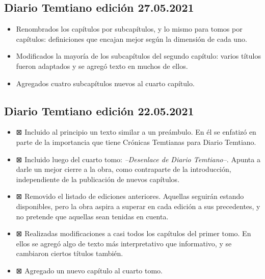 \documentclass[
]{book}
\begin{document}
\hypertarget{diario-temtiano-ediciuxf3n-27.05.2021}{%
\subsection*{Diario Temtiano edición 27.05.2021}\label{diario-temtiano-ediciuxf3n-27.05.2021}}

\begin{itemize}
\item
  Renombrados los capítulos por subcapítulos, y lo mismo para tomos por capítulos: definiciones que encajan mejor según la dimensión de cada uno.
\item
  Modificados la mayoría de los subcapítulos del segundo capítulo: varios títulos fueron adaptados y se agregó texto en muchos de ellos.
\item
  Agregados cuatro subcapítulos nuevos al cuarto capítulo.
\end{itemize}

\hypertarget{diario-temtiano-ediciuxf3n-22.05.2021}{%
\subsection*{Diario Temtiano edición 22.05.2021}\label{diario-temtiano-ediciuxf3n-22.05.2021}}

\begin{itemize}
\item
  ⊠ Incluido al principio un texto similar a un preámbulo. En él se enfatizó en parte de la importancia que tiene Crónicas Temtianas para Diario Temtiano.
\item
  ⊠ Incluido luego del cuarto tomo: \emph{--Desenlace de Diario Temtiano--}. Apunta a darle un mejor cierre a la obra, como contraparte de la introducción, independiente de la publicación de nuevos capítulos.
\item
  ⊠ Removido el listado de ediciones anteriores. Aquellas seguirán estando disponibles, pero la obra aspira a superar en cada edición a sus precedentes, y no pretende que aquellas sean tenidas en cuenta.
\item
  ⊠ Realizadas modificaciones a casi todos los capítulos del primer tomo. En ellos se agregó algo de texto más interpretativo que informativo, y se cambiaron ciertos títulos también.
\item
  ⊠ Agregado un nuevo capítulo al cuarto tomo.
\end{itemize}
\end{document}
